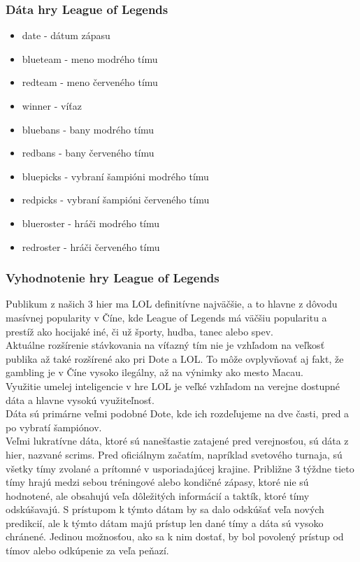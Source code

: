 \subsubsection{Dáta hry League of Legends}
\begin{itemize}
\item date - dátum zápasu 
\item blueteam - meno modrého tímu 
\item redteam - meno červeného tímu 
\item winner - víťaz 
\item bluebans - bany modrého tímu 
\item redbans - bany červeného tímu 
\item bluepicks - vybraní šampióni modrého tímu 
\item redpicks - vybraní šampióni červeného tímu 
\item blueroster - hráči modrého tímu 
\item redroster - hráči červeného tímu 
\end{itemize}
\subsubsection{Vyhodnotenie hry League of Legends}

Publikum z našich 3 hier ma LOL definitívne najväčšie, a to hlavne z dôvodu masívnej popularity v Číne, kde League of Legends má väčšiu popularitu a prestíž ako hocijaké iné, či už športy, hudba, tanec alebo spev. \cite{chinalol} 
\\
Aktuálne rozšírenie stávkovania na víťazný tím nie je vzhľadom na veľkosť publika až také rozšírené ako pri Dote a LOL. To môže ovplyvňovať aj fakt, že gambling je v Číne vysoko ilegálny, až na výnimky ako mesto Macau.\cite{chinagambling}
\\
Využitie  umelej inteligencie v hre LOL je veľké vzhľadom na verejne dostupné dáta a hlavne vysokú využiteľnosť.
\\
Dáta sú primárne veľmi podobné Dote, kde ich rozdeľujeme na dve časti, pred a po vybratí šampiónov.
\\
Veľmi lukratívne dáta, ktoré sú nanešťastie zatajené pred verejnosťou, sú dáta z hier, nazvané scrims. Pred oficiálnym začatím, napríklad svetového turnaja, sú všetky tímy zvolané a prítomné v usporiadajúcej krajine. Približne 3 týždne tieto tímy hrajú medzi sebou tréningové alebo kondičné zápasy, ktoré nie sú hodnotené, ale obsahujú veľa dôležitých informácií a taktík, ktoré tímy odskúšavajú. S prístupom k týmto dátam by sa dalo odskúšať veľa nových predikcií, ale k týmto dátam majú prístup len dané tímy a dáta sú vysoko chránené. Jedinou možnosťou, ako sa k nim dostať, by bol povolený prístup od tímov alebo odkúpenie za veľa peňazí.
\\


